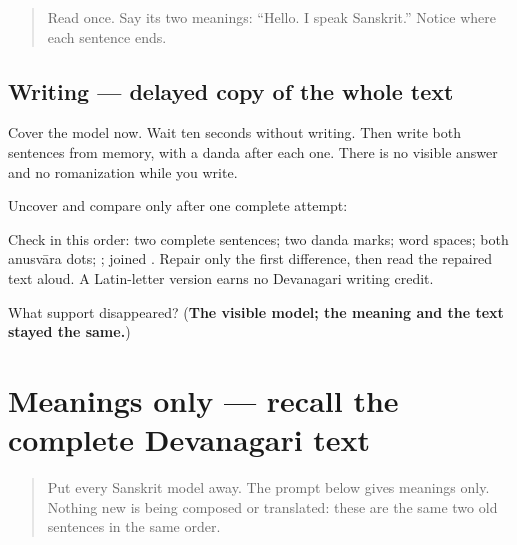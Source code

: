 \label{lesson:SA-W65-connected-text-delayed-copy}



\begin{quote}
Read \textbf{   } once. Say its two meanings: “Hello. I speak Sanskrit.” Notice where each sentence ends.
\end{quote}

\subsection*{Writing — delayed copy of the whole text}
Cover the model now. Wait ten seconds without writing. Then write both sentences from memory, with a danda after each one. There is no visible answer and no romanization while you write.

Uncover and compare only after one complete attempt:

\begin{quote}
\textbf{   }
\end{quote}

Check in this order: two complete sentences; two danda marks; word spaces; both anusvāra dots; \textbf{}; joined \textbf{}. Repair only the first difference, then read the repaired text aloud. A Latin-letter version earns no Devanagari writing credit.

\begin{tcolorbox}[breakable,colback=teal!4,colframe=teal!35!black,title={Before you move on}]
What support disappeared? (\textbf{The visible model; the meaning and the text stayed the same.})
\end{tcolorbox}
\section[\texorpdfstring{\sk{नमस्ते।} \sk{अहं} \sk{संस्कृतं} … (namaste. ahaṁ …)}{नमस्ते। अहं संस्कृतं … (namaste. ahaṁ …)}]{Meanings only — recall the complete Devanagari text}

\label{lesson:SA-W65-connected-text-independent-recall}



\begin{quote}
Put every Sanskrit model away. The prompt below gives meanings only. Nothing new is being composed or translated: these are the same two old sentences in the same order.
\end{quote}


